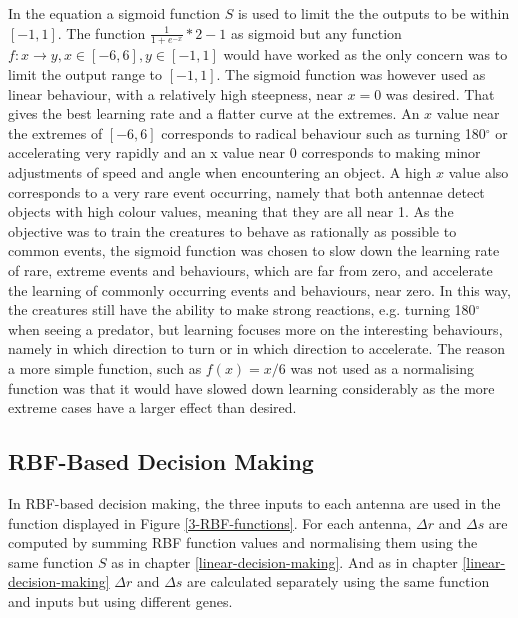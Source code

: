 \documentclass[a4paper,11pt]{kth-mag}
\begin{document}
In the equation a sigmoid function $S$ is used to limit the the outputs to be within $[-1,1]$. The function $\frac{1}{1+e^{-x}} * 2 -1$ as sigmoid but any function $f:x\rightarrow y, x\in [-6,6], y \in [-1,1]$ would have worked as the only concern was to limit the output range to $[-1,1]$. The sigmoid function was however used as linear behaviour, with a relatively high steepness, near $x=0$ was desired. That gives the best learning rate and a flatter curve at the extremes. An $x$ value near the extremes of $[-6,6]$ corresponds to radical behaviour such as turning 180$^\circ$ or accelerating very rapidly and an x value near 0 corresponds to making minor adjustments of speed and angle when encountering an object. A high $x$ value also corresponds to a very rare event occurring, namely that both antennae detect objects with high colour values, meaning that they are all near 1. As the objective was to train the creatures to behave as rationally as possible to common events, the sigmoid function was chosen to slow down the learning rate of rare, extreme events and behaviours, which are far from zero, and accelerate the learning of commonly occurring events and behaviours, near zero.
In this way, the creatures still have the ability to make strong reactions, e.g. turning 180$^\circ$ when seeing a predator, but learning focuses more on the interesting behaviours, namely in which direction to turn or in which direction to accelerate. The reason a more simple function, such as $f(x) = x/6$ was not used as a normalising function was that it would have slowed down learning considerably as the more extreme cases have a larger effect than desired.

\subsection{RBF-Based Decision Making}

In RBF-based decision making, the three inputs to each antenna are used in the function displayed in Figure \ref{3-RBF-functions}. For each antenna, $\Delta r$  and $\Delta s$ are computed by summing RBF function values and normalising them using the same function $S$ as in chapter \ref{linear-decision-making}. And as in chapter \ref{linear-decision-making} $\Delta r$ and $\Delta s$ are calculated separately using the same function and inputs but using different genes.
\end{document}
